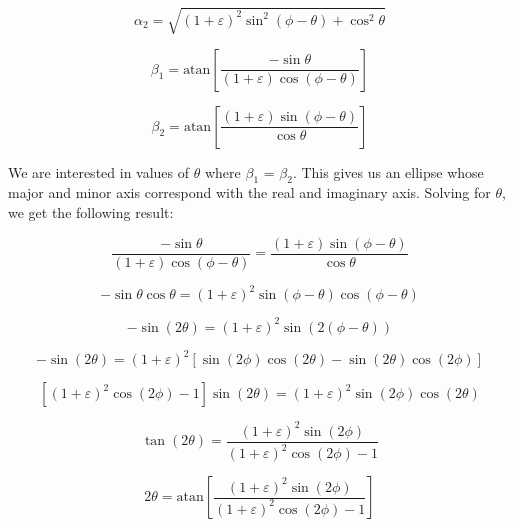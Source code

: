 \documentclass{article}
\begin{document}
\begin{equation}
	\alpha_2 = \sqrt{(1+\varepsilon)^2\sin^2(\phi-\theta)+\cos^2\theta}
\end{equation}

\begin{equation}
	\beta_1 = \text{atan}\left[\frac{-\sin\theta}{(1+\varepsilon)\cos(\phi-\theta)}\right]
\end{equation}

\begin{equation}
	\beta_2 = \text{atan}\left[\frac{(1+\varepsilon)\sin(\phi-\theta)}{\cos\theta}\right]
\end{equation}

We are interested in values of $\theta$ where $\beta_1$ = $\beta_2$. This gives us an ellipse whose major and minor axis correspond with the real and imaginary axis. Solving for $\theta$, we get the following result:

\begin{equation}
	\frac{-\sin\theta}{(1+\varepsilon)\cos(\phi-\theta)} = \frac{(1+\varepsilon)\sin(\phi-\theta)}{\cos\theta}
\end{equation}

\begin{equation}
	-\sin\theta\cos\theta = (1+\varepsilon)^2\sin(\phi-\theta)\cos(\phi-\theta)
\end{equation}

\begin{equation}
	-\sin(2\theta) = (1+\varepsilon)^2\sin(2(\phi-\theta))
\end{equation}

\begin{equation}
	-\sin(2\theta)=(1+\varepsilon)^2\left[\sin(2\phi)\cos(2\theta) - \sin(2\theta)\cos(2\phi)\right]
\end{equation}

\begin{equation}
	\left[(1+\varepsilon)^2\cos(2\phi)-1\right]\sin(2\theta)=(1+\varepsilon)^2\sin(2\phi)\cos(2\theta)
\end{equation}

\begin{equation}
	\tan(2\theta)=\frac{(1+\varepsilon)^2\sin(2\phi)}{(1+\varepsilon)^2\cos(2\phi)-1}
\end{equation}

\begin{equation}
	2\theta = \text{atan}\left[\frac{(1+\varepsilon)^2\sin(2\phi)}{(1+\varepsilon)^2\cos(2\phi)-1}\right]
\end{equation}
\end{document}

